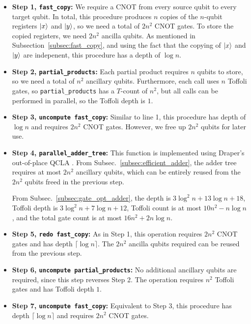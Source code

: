 \documentclass[reprint,amsmath,amssymb,aps,pra]{revtex4-2}
\begin{document}
\begin{itemize}
\item \textbf{Step 1, \texttt{fast\_copy}: }We require a CNOT from every source qubit to every target qubit. In total, this procedure produces $n$ copies of the $n$-qubit registers $\ket{x}$ and $\ket{y}$, so we need a total of $2n^2$ CNOT gates. To store the copied registers, we need $2n^2$ ancilla qubits. As mentioned in Subsection~\ref{subsec:fast_copy}, and using the fact that the copying of $\ket{x}$ and $\ket{y}$ are indepenent, this procedure has a depth of $\log{n}$.

\item \textbf{Step 2, \texttt{partial\_products}: }Each partial product requires $n$ qubits to store, so we need a total of $n^2$ ancillary qubits. Furthermore, each call uses $n$ Toffoli gates, so \texttt{partial\_products} has a $T$-count of $n^2$, but all calls can be performed in parallel, so the Toffoli depth is $1$.

\item \textbf{Step 3, \texttt{uncompute fast\_copy}: }Similar to line 1, this procedure has depth of $\log{n}$ and requires $2n^2$ CNOT gates. However, we free up $2n^2$ qubits for later use.

\item \textbf{Step 4, \texttt{parallel\_adder\_tree}: }
This function is implemented using Draper’s out-of-place QCLA \cite{Draper2004}. From Subsec.~\ref{subsec:efficient_adder}, the adder tree requires at most $2n^2$ ancillary qubits, which can be entirely reused from the $2n^2$ qubits freed in the previous step.

From Subsec.~\ref{subsec:gate_opt_adder}, 
the depth is 
$3\log^2{n}+13\log{n}+18$, Toffoli depth is $3\log^2{n}+7\log{n}+12$, 
Toffoli count is at most 
$10n^2 -n\log n$, and the total gate count is at most 
$16n^2 +2n\log n$. 


\item \textbf{Step 5, \texttt{redo fast\_copy}: }As in Step 1, this operation requires $2n^2$ CNOT gates and has depth $\lceil \log n \rceil$. The $2n^2$ ancilla qubits required can be reused from the previous step.

\item \textbf{Step 6, \texttt{uncompute partial\_products}: }No additional ancillary qubits are required, since this step reverses Step 2. The operation requires $n^2$ Toffoli gates and has Toffoli depth $1$.

\item \textbf{Step 7, \texttt{uncompute fast\_copy}: } Equivalent to Step 3, this procedure has depth $\lceil \log n \rceil$ and requires $2n^2$ CNOT gates.
\end{itemize}
\end{document}
